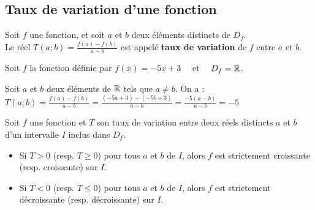\documentclass[10pt, a4paper]{article}
\begin{document}
\subsection{Taux de variation d'une fonction }

\begin{Definition}[]
Soit $f$ une fonction, et soit $a$ et $b$ deux éléments distincts de $D_f$. 
\vspace{0.2cm} \\
Le réel $T(a;b) = \frac{f(a)-f(b)}{a-b}$ est appelé \textbf{taux de variation} de $f$ entre $a$ et $b$.
\end{Definition}

\begin{Exemple}[][10 min]
Soit $f$ la fonction définie par $f(x) = -5x + 3 \quad$ et $\quad D_f = \mathbb{R}$.

Soit $a$ et $b$ deux éléments de $\mathbb{R}$ tels que $a \neq b$. On a :~~
 $T(a;b) = \frac{f(a)-f(b)}{a-b} = \frac{(-5a+3) - (-5b+3)}{a-b} = \frac{-5(a-b)}{a-b} = -5$ 
\end{Exemple}

\begin{Propriete}[]
Soit $f$ une fonction et $T$ son taux de variation entre deux réels distincts $a$ et $b$ d'un intervalle $I$ inclus dans $D_f$.
\begin{itemize}[leftmargin=*,itemsep=0.5pt]
    \item Si $T > 0$ (resp. $T \geq 0$) pour tous $a$ et $b$ de $I$, alors $f$ est strictement croissante (resp. croissante) sur $I$.
    \item Si $T < 0$ (resp. $T \leq 0$) pour tous $a$ et $b$ de $I$, alors $f$ est strictement décroissante (resp. décroissante) sur $I$.
\end{itemize}
\end{Propriete}
\end{document}
